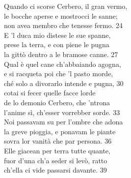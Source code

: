 \documentclass[10pt,a4paper]{article}
\begin{document}
	\begin{estratto}
		Quando ci scorse Cerbero, il gran vermo,\\
		le bocche aperse e mostrocci le sanne;\\
		non avea membro che tenesse fermo.		24\\
		
		E ’l duca mio distese le sue spanne,\\
		prese la terra, e con piene le pugna\\
		la gittò dentro a le bramose canne.		27\\
		
		Qual è quel cane ch’abbaiando agogna,\\
		e si racqueta poi che ’l pasto morde,\\
		ché solo a divorarlo intende e pugna,		30\\
		
		cotai si fecer quelle facce lorde\\
		de lo demonio Cerbero, che ’ntrona\\
		l’anime sì, ch’esser vorrebber sorde.		33\\
		
		Noi passavam su per l’ombre che adona\\
		la greve pioggia, e ponavam le piante\\
		sovra lor vanità che par persona.		36\\
		
		Elle giacean per terra tutte quante,\\
		fuor d’una ch’a seder si levò, ratto\\
		ch’ella ci vide passarsi davante.		39\\
	\end{estratto}
	
\end{document}
